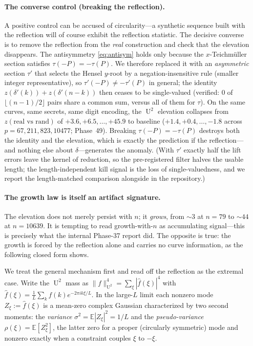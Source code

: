 \documentclass[11pt]{article}
\theoremstyle{definition}
\DeclareMathOperator{\Uk}{U}
\begin{document}
\paragraph{The converse control (breaking the reflection).} A positive
control can be accused of circularity---a synthetic sequence built with
the reflection will of course exhibit the reflection statistic. The
decisive converse is to remove the reflection from the \emph{real}
construction and check that the elevation disappears. The antisymmetry
\eqref{eq:antisym} holds only because the $x$-Teichm\"uller section
satisfies $\tau(-P)=-\tau(P)$. We therefore replaced it with an
\emph{asymmetric} section $\tau'$ that selects the Hensel $y$-root by a
negation-insensitive rule (smaller integer representative), so
$\tau'(-P)\neq-\tau'(P)$ in general; the identity
$z(\delta'(k))+z(\delta'(n-k))$ then ceases to be single-valued (verified:
$0$ of $\lfloor(n-1)/2\rfloor$ pairs share a common sum, versus all of
them for $\tau$). On the same curves, same secrets, same digit encoding,
the $\Uk^2$ elevation collapses from $z(\text{real vs rand})$ of
$+3.6,+6.5,\dots,+45.9$ to baseline ($+1.4,+0.4,\dots,-1.8$ across
$p=67,211,823,10477$; Phase~49). Breaking $\tau(-P)=-\tau(P)$ destroys
both the identity and the elevation, which is exactly the prediction if
the reflection---and nothing else about $\delta$---generates the anomaly.
(With $\tau'$ exactly half the lift errors leave the kernel of reduction,
so the pre-registered filter halves the usable length; the
length-independent kill signal is the loss of single-valuedness, and we
report the length-matched comparison alongside in the repository.)

\paragraph{The growth law is itself an artifact signature.} The elevation
does not merely persist with $n$; it \emph{grows}, from $\sim3$ at $n=79$
to $\sim44$ at $n=10639$. It is tempting to read growth-with-$n$ as
accumulating signal---this is precisely what the internal Phase-37 report
did. The opposite is true: the growth is forced by the reflection alone
and carries no curve information, as the following closed form shows.

We treat the general mechanism first and read off the reflection as the
extremal case. Write the $\Uk^2$ mass as
$\|f\|_{\Uk^2}^4=\sum_\xi|\hat f(\xi)|^4$ with
$\hat f(\xi)=\tfrac1L\sum_k f(k)e^{-2\pi ik\xi/L}$. In the large-$L$ limit
each nonzero mode $Z_\xi:=\hat f(\xi)$ is a mean-zero complex Gaussian
characterized by two second moments: the \emph{variance}
$\sigma^2=\mathbb E|Z_\xi|^2=1/L$ and the \emph{pseudo-variance}
$\rho(\xi)=\mathbb E[Z_\xi^2]$, the latter zero for a proper
(circularly symmetric) mode and nonzero exactly when a constraint couples
$\xi$ to $-\xi$.
\end{document}
